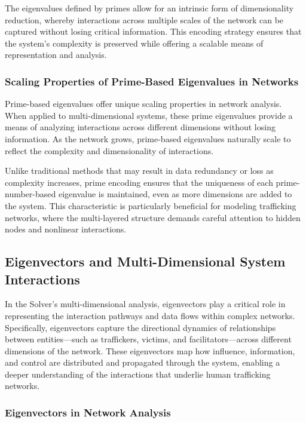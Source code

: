\documentclass[%
 preprint, linenumbers,
 amsmath,amssymb,
 aps, physrev,
]{revtex4-2}
\begin{document}
The eigenvalues defined by primes allow for an intrinsic form of dimensionality reduction, whereby interactions across multiple scales of the network can be captured without losing critical information. This encoding strategy ensures that the system's complexity is preserved while offering a scalable means of representation and analysis.

\subsubsection{Scaling Properties of Prime-Based Eigenvalues in Networks}

Prime-based eigenvalues offer unique scaling properties in network analysis. When applied to multi-dimensional systems, these prime eigenvalues provide a means of analyzing interactions across different dimensions without losing information. As the network grows, prime-based eigenvalues naturally scale to reflect the complexity and dimensionality of interactions.

Unlike traditional methods that may result in data redundancy or loss as complexity increases, prime encoding ensures that the uniqueness of each prime-number-based eigenvalue is maintained, even as more dimensions are added to the system. This characteristic is particularly beneficial for modeling trafficking networks, where the multi-layered structure demands careful attention to hidden nodes and nonlinear interactions.

\subsection{Eigenvectors and Multi-Dimensional System Interactions}

In the Solver’s multi-dimensional analysis, eigenvectors play a critical role in representing the interaction pathways and data flows within complex networks. Specifically, eigenvectors capture the directional dynamics of relationships between entities—such as traffickers, victims, and facilitators—across different dimensions of the network. These eigenvectors map how influence, information, and control are distributed and propagated through the system, enabling a deeper understanding of the interactions that underlie human trafficking networks.

\subsubsection{Eigenvectors in Network Analysis}
\end{document}
